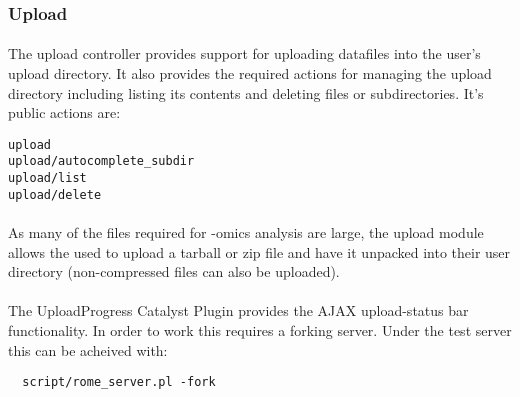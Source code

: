 \subsubsection{Upload}
\label{sec:controller_upload}

\paragraph{}
The upload controller provides support for uploading datafiles into the user's upload directory. It also provides the required actions for managing the upload directory including listing its contents and deleting files or subdirectories. It's public actions are:

\begin{scriptsize}
\begin{verbatim}
upload
upload/autocomplete_subdir
upload/list
upload/delete
\end{verbatim}
\end{scriptsize}

\paragraph{}
As many of the files required for -omics analysis are large, the upload module allows the used to upload a tarball or zip file and have it unpacked into their user directory (non-compressed files can also be uploaded). 

\paragraph{}
The UploadProgress Catalyst Plugin provides the AJAX upload-status bar functionality. In order to work this requires a forking server. Under the test server this can be acheived with:

\begin{scriptsize}
\begin{verbatim}
  script/rome_server.pl -fork 
\end{verbatim}
\end{scriptsize}